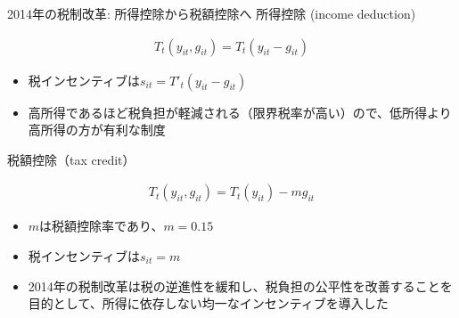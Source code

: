 \documentclass[
  ignorenonframetext,
  aspectratio=169,
]{beamer}
\providecommand{\tightlist}{%
  \setlength{\itemsep}{0pt}\setlength{\parskip}{0pt}}
\begin{document}
\begin{frame}{2014年の税制改革: 所得控除から税額控除へ}
\protect\hypertarget{ux5e74ux306eux7a0eux5236ux6539ux9769-ux6240ux5f97ux63a7ux9664ux304bux3089ux7a0eux984dux63a7ux9664ux3078}{}
所得控除 (income deduction)

\begin{align}
  T_t(y_{it}, g_{it}) = T_t(y_{it} - g_{it})
\end{align}

\begin{itemize}
\tightlist
\item
  税インセンティブは\(s_{it} = T'_t(y_{it} - g_{it})\)
\item
  高所得であるほど税負担が軽減される（限界税率が高い）ので、低所得より高所得の方が有利な制度
\end{itemize}

税額控除（tax credit）

\begin{align}
  T_t(y_{it}, g_{it}) = T_t(y_{it}) - m g_{it}
\end{align}

\begin{itemize}
\tightlist
\item
  \(m\)は税額控除率であり、\(m = 0.15\)
\item
  税インセンティブは\(s_{it} = m\)
\item
  2014年の税制改革は税の逆進性を緩和し、税負担の公平性を改善することを目的として、所得に依存しない均一なインセンティブを導入した
\end{itemize}
\end{frame}
\end{document}
